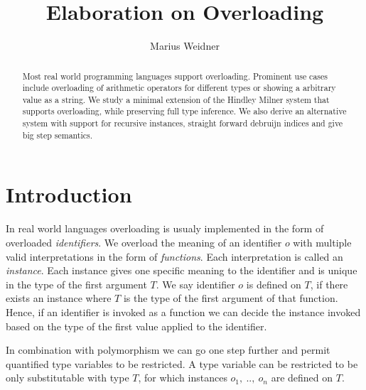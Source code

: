 \documentclass[runningheads]{llncs}
\begin{document}
\title{Elaboration on Overloading}
\author{Marius Weidner}
\maketitle

\begin{abstract}
Most real world programming languages support overloading. 
Prominent use cases include overloading of arithmetic operators for different types or showing a arbitrary value as a string. 
We study a minimal extension of the Hindley Milner system that supports overloading, while preserving full type inference. 
We also derive an alternative system with support for recursive instances, straight forward debruijn indices and give big step semantics.
\end{abstract}

\section{Introduction}
In real world languages overloading is usualy implemented in the form of overloaded \emph{identifiers}.
We overload the meaning of an identifier $o$ with multiple valid interpretations in the form of \emph{functions}. 
Each interpretation is called an \emph{instance}.
Each instance gives one specific meaning to the identifier and is unique in the type of the first argument $T$. 
We say identifier $o$ is defined on $T$, if there exists an instance where $T$ is the type of the first argument of that function.
Hence, if an identifier is invoked as a function we can decide the instance invoked based on the type of the first value applied to the identifier. 

In combination with polymorphism we can go one step further and permit quantified type variables to be restricted. 
A type variable can be restricted to be only substitutable with type $T$, for which instances $o_1, \ .., \ o_n$ are defined on $T$. 
\end{document}

